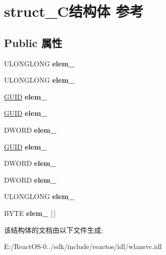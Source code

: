 \hypertarget{structstruct___c}{}\section{struct\+\_\+\+C结构体 参考}
\label{structstruct___c}
\subsection*{Public 属性}
\begin{DoxyCompactItemize}
\item 
\mbox{\label{structstruct___c_a6fbb50ed7ffb759747f4db34e6955917}} 
U\+L\+O\+N\+G\+L\+O\+NG {\bfseries elem\+\_}
\item 
\mbox{\label{structstruct___c_a069ab53d56b4c4ae1333fb1fd2bc4ebf}} 
U\+L\+O\+N\+G\+L\+O\+NG {\bfseries elem\+\_}
\item 
\mbox{\label{structstruct___c_a89328db81f052905cd13acd4c4672e67}} 
\hyperlink{interface_g_u_i_d}{G\+U\+ID} {\bfseries elem\+\_}
\item 
\mbox{\label{structstruct___c_a396347bec4eb8864e4c8aee2beeedf61}} 
\hyperlink{interface_g_u_i_d}{G\+U\+ID} {\bfseries elem\+\_}
\item 
\mbox{\label{structstruct___c_aec6770cc08c3049727b94d8b249f3b0c}} 
D\+W\+O\+RD {\bfseries elem\+\_}
\item 
\mbox{\label{structstruct___c_a69af68fb4beac2180386b235785d2f83}} 
\hyperlink{interface_g_u_i_d}{G\+U\+ID} {\bfseries elem\+\_}
\item 
\mbox{\label{structstruct___c_a88f247e2ceecf96f7777a2553e253e93}} 
D\+W\+O\+RD {\bfseries elem\+\_}
\item 
\mbox{\label{structstruct___c_a954c72fc94998263a3b98fb48c1eee62}} 
D\+W\+O\+RD {\bfseries elem\+\_}
\item 
\mbox{\label{structstruct___c_a6b466e558d3f296ce4b01283b099dcad}} 
U\+L\+O\+N\+G\+L\+O\+NG {\bfseries elem\+\_}
\item 
\mbox{\label{structstruct___c_a89adbebb31f693f4338cacf222e1da67}} 
B\+Y\+TE {\bfseries elem\+\_} \mbox{[}$\,$\mbox{]}
\end{DoxyCompactItemize}


该结构体的文档由以下文件生成\+:\begin{DoxyCompactItemize}
\item 
E\+:/\+React\+O\+S-\/0../sdk/include/reactos/idl/wlansvc.\+idl\end{DoxyCompactItemize}
